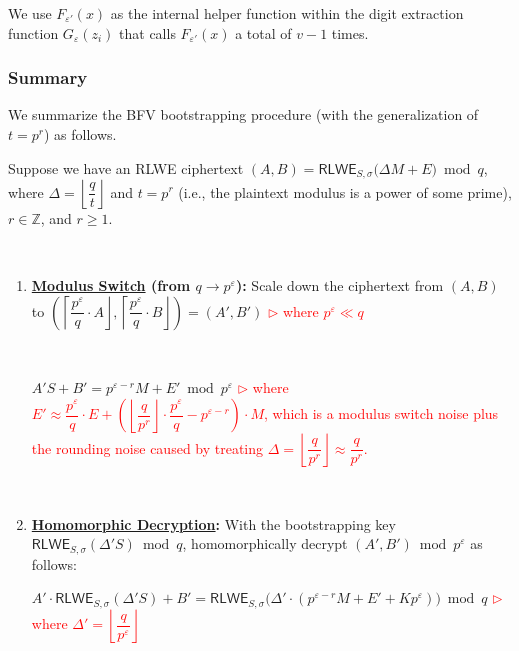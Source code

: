 We use $F_{\varepsilon'}(x)$ as the internal helper function within the digit extraction function $G_{\varepsilon}(z_i)$ that calls $F_{\varepsilon'}(x)$ a total of $v-1$ times.


\subsubsection{Summary}
\label{subsubsec:bfv-bootstrapping-summary}

We summarize the BFV bootstrapping procedure (with the generalization of $t = p^r$) as follows. 

\begin{tcolorbox}[title={\textbf{\tboxlabel{\ref*{subsubsec:bfv-bootstrapping-summary}} BFV Bootstrapping}}]

Suppose we have an RLWE ciphertext $(A, B)  = \textsf{RLWE}_{S, \sigma}\bm(\Delta M + E\bm) \bmod q$, where $\Delta = \left\lfloor\dfrac{q}{t}\right\rfloor$ and $t = p^r$ (i.e., the plaintext modulus is a power of some prime), $r \in \mathbb{Z}$, and $r \geq 1$. 

$ $

\begin{enumerate}
\item \textbf{\underline{Modulus Switch} (from \boldmath$q \rightarrow p^\varepsilon$):} Scale down the ciphertext from $(A, B)$ to $\left(\left\lceil \dfrac{p^\varepsilon}{q}\cdot A\right\rfloor, \left\lceil \dfrac{p^\varepsilon}{q}\cdot B\right\rfloor\right) = (A', B')$ \textcolor{red}{ $\rhd$ where $p^\varepsilon \ll q$} 

$ $

$A'S + B' = p^{\varepsilon-r}M + E' \bmod p^\varepsilon$ \textcolor{red}{ $\rhd$ where $E' \approx \dfrac{p^\varepsilon}{q}\cdot E  + \left(\left\lfloor\dfrac{q}{p^r}\right\rfloor\cdot\dfrac{p^\varepsilon}{q} - p^{\varepsilon-r}\right)\cdot M$, which is a modulus switch noise plus the rounding noise caused by treating $\Delta=\left\lfloor\dfrac{q}{p^r}\right\rfloor \approx \dfrac{q}{p^r}$.}

$ $

\item \textbf{\underline{Homomorphic Decryption}:} With the bootstrapping key $\textsf{RLWE}_{S, \sigma}(\Delta' S) \bmod q$, homomorphically decrypt $(A', B') \bmod p^\varepsilon$ as follows:

$A' \cdot \textsf{RLWE}_{S, \sigma}(\Delta' S)  + B' = \textsf{RLWE}_{S, \sigma}\bm(\Delta' \cdot (p^{\varepsilon-r} M + E' + Kp^\varepsilon)\bm) \bmod q$ \textcolor{red}{ $\rhd$ where $\Delta' = \left\lfloor\dfrac{q}{p^\varepsilon}\right\rfloor$}


\end{enumerate}
\end{tcolorbox}
